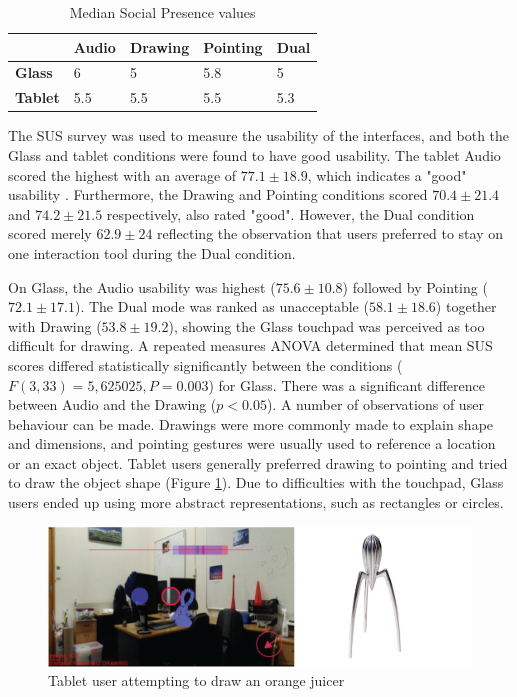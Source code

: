 \begin{table}[]
    \caption{Median Social Presence values}
    \centering
    \begin{tabular}{@{}lllll@{}}
    \toprule
    \textbf{}       & \textbf{Audio} & \textbf{Drawing} & \textbf{Pointing} & \textbf{Dual} \\ \midrule
    \textbf{Glass}  & 6              & 5                & 5.8               & 5             \\
    \textbf{Tablet} & 5.5            & 5.5              & 5.5               & 5.3           \\ \bottomrule
    \end{tabular}
    \label{tbl:ismar14-results}
\end{table}

The SUS survey was used to measure the usability of the interfaces, and both the Glass and tablet conditions were found to have good usability. The tablet Audio scored the highest with an average of $77.1\pm18.9$, which indicates a "good" usability \cite{Bangor2008}. Furthermore, the Drawing and Pointing conditions scored $70.4\pm21.4$ and $74.2\pm21.5$ respectively, also rated "good". However, the Dual condition scored merely $62.9\pm24$ reflecting the observation that users preferred to stay on one interaction tool during the Dual condition.

On Glass, the Audio usability was highest ($75.6\pm10.8$) followed by Pointing ($72.1\pm17.1$). The Dual mode was ranked as unacceptable ($58.1\pm18.6$) together with Drawing ($53.8\pm19.2$), showing the Glass touchpad was perceived as too difficult for drawing. A repeated measures ANOVA determined that mean SUS scores differed statistically significantly between the conditions ($F(3, 33)=5,625025, P=0.003$) for Glass. There was a significant difference between Audio and the Drawing ($p<0.05$). A number of observations of user behaviour can be made. Drawings were more commonly made to explain shape and dimensions, and pointing gestures were usually used to reference a location or an exact object. Tablet users generally preferred drawing to pointing and tried to draw the object shape (Figure \ref{fig:ismar14:tablet-drawing}). Due to difficulties with the touchpad, Glass users ended up using more abstract representations, such as rectangles or circles.

\begin{figure}[ht]
	\centering
	\includegraphics[width=\linewidth]{images/ismar14/tablet-drawing}
	\caption{Tablet user attempting to draw an orange juicer}
	\label{fig:ismar14:tablet-drawing}
\end{figure}

